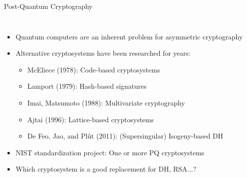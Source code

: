 \documentclass[fleqn,compress,utf8,aspectratio=169,t]{beamer}
\begin{document}
\begin{frame}{Post-Quantum Cryptography}
  \begin{columns}[T]
  \begin{itemize}
    \item Quantum computers are an inherent problem for asymmetric cryptography
    \item<2-> Alternative cryptosystems have been researched for years:
    \begin{itemize}
      \item McEliece (1978): Code-based cryptosystems\cite{berlekamp1978inherent}
      \item Lamport (1979): Hash-based signatures\cite{lamport1979constructing}
      \item Imai, Matsumoto (1988): Multivariate cryptography\cite{matsumoto1988public}
      \item Ajtai (1996): Lattice-based cryptosystems\cite{ajtai1996generating}
      \item De Feo, Jao, and Plût (2011): (Supersingular) Isogeny-based DH\cite{jao2011towards}
    \end{itemize}
    \item<3-> NIST standardization project: One or more PQ cryptosystems
    \item<4-> Which cryptosystem is a good replacement for DH, RSA...?
  \end{itemize}
\end{columns}
\end{frame}
\end{document}
